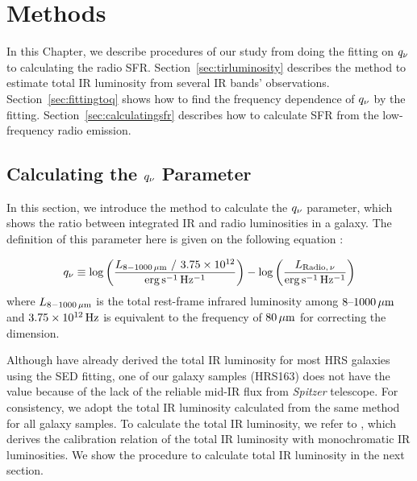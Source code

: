 \chapter{Methods}\label{chap:methods}
\begin{chapabstract}

In this Chapter, we describe procedures of our study from doing the fitting on $q_{\nu}$ to calculating the radio SFR\@.
Section~\ref{sec:tirluminosity} describes the method to estimate total IR luminosity from several IR bands' observations.
Section~\ref{sec:fittingtoq} shows how to find the frequency dependence of $q_{\nu}$ by the fitting.
Section~\ref{sec:calculatingsfr} describes how to calculate SFR from the low-frequency radio emission.

\end{chapabstract}

\section{Calculating the $q_{\nu}$ Parameter}\label{sec:calculatingq}
In this section, we introduce the method to calculate the $q_{\nu}$ parameter, which shows the ratio between integrated IR and radio luminosities in a galaxy.
The definition of this parameter here is given on the following equation \citep[e.g.,][]{Helou1985, Bell2003, CalistroRivera2017a}:

\begin{equation}\label{eq:q_def}
    q_{\nu} \equiv \log\left(\frac{L_{\mathrm{8-1000\,\mu m}}\ /\ 3.75 \times 10^{12}}{{\rm erg\,s^{-1}\,Hz^{-1}}}\right) - \log\left(\frac{L_{\mathrm{Radio},\,\nu}}{{\rm erg\,s^{-1}\,Hz^{-1}}}\right)
\end{equation}
where $L_{\mathrm{8-1000\,\mu m}}$ is the total rest-frame infrared luminosity among $8 \mbox{--} 1000\,\mathrm{\mu m}$ and $3.75\times10^{12}\,\mathrm{Hz}$ is equivalent to the frequency of $80\,\mathrm{\mu m}$ for correcting the dimension.

Although \citet{Ciesla2014} have already derived the total IR luminosity for most HRS galaxies using the SED fitting, one of our galaxy samples (HRS163) does not have the value because of the lack of the reliable mid-IR flux from {\it Spitzer\/} telescope.
For consistency, we adopt the total IR luminosity calculated from the same method for all galaxy samples.
To calculate the total IR luminosity, we refer to \citet{Galametz2013}, which derives the calibration relation of the total IR luminosity with monochromatic IR luminosities.
We show the procedure to calculate total IR luminosity in the next section.



